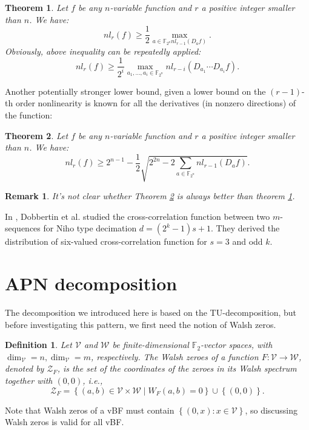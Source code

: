 \documentclass[8pt,oneside]{article}
\newcommand{\0}{\textbf{0}}
\newcommand{\1}{\textbf{1}}
\newcommand{\F}{\mathbb{F}}
\newtheorem{theorem}{Theorem}
\newtheorem{definition}{Definition}
\newtheorem{remark}{Remark}
\begin{document}
    \begin{theorem}\label{TH:NL_onederivate}
        Let $f$ be any $ n $-variable function and $ r $ a positive integer smaller than $ n $. We have:
        \[nl_r(f)\ge\frac{1}{2}\max_{a\in\F_{2^n}nl_{r-1}(D_af)}.\]
        Obviously, above inequality can be repeatedly applied: 
        \[nl_r(f)\ge \frac{1}{2^i}\max_{a_1,\dots,a_i\in\F_{2^n}}nl_{r-i}(D_{a_1}\cdots D_{a_i}f).\]
    \end{theorem}
    Another potentially stronger lower bound, given a lower bound on the $ (r-1) $-th order nonlinearity is 
    known for all the derivatives (in nonzero directions) of the function:
    \begin{theorem}\label{TH:NL_allderivates}
        Let $f$ be any $ n $-variable function and $ r $ a positive integer smaller than $ n $. We have:
        \[nl_r(f) \ge 2^{n-1} -\frac{1}{2}\sqrt{2^{2n}-2\sum_{a\in\F_{2^n}}nl_{r-1}(D_af)}.\]
    \end{theorem}
    \begin{remark}
        It's not clear whether Theorem \ref{TH:NL_allderivates} is always better than theorem \ref{TH:NL_onederivate}.
    \end{remark}
    
    In \cite{dobbertin2006niho_dickson_kloosterman}, Dobbertin et al. studied the cross-correlation function between two 
    $ m $-sequences for Niho type decimation $ d=(2^k-1)s+1 $. 
    They derived the distribution of six-valued cross-correlation function for $ s=3 $ and odd $ k $. 
    
\section{APN decomposition}
    The decomposition \cite{BeierleCLP2022ninebitAPNpermutation_error} we introduced here
    is based on the TU-decomposition, but before investigating this pattern, we first need the notion of Walsh zeros.
    \begin{definition}
        Let $ \mathcal{V} $ and $ \mathcal{W} $  be finite-dimensional $\F_2 $-vector spaces, 
        with $ \dim_{\mathcal{V}}=n,\dim_{\mathcal{V}}=m $, respectively. 
        The Walsh zeroes of a function $ F : \mathcal{V}\rightarrow \mathcal{W} $, denoted by $ \mathcal{Z}_F $, 
        is the set of the coordinates of the zeroes in its Walsh spectrum together with $ (0, 0) $, i.e.,
        \[\mathcal{Z}_F=\left\{ (a,b)\in\mathcal{V}\times\mathcal{W}\mid W_F(a,b)=0 \right\}\cup\left\{ (0,0) \right\}.\]
    \end{definition}
    Note that Walsh zeros of a vBF must contain $ \left\{ (0,x):x\in\mathcal{V} \right\} $, so discussing Walsh zeros 
    is valid for all vBF. 
    
\end{document}
